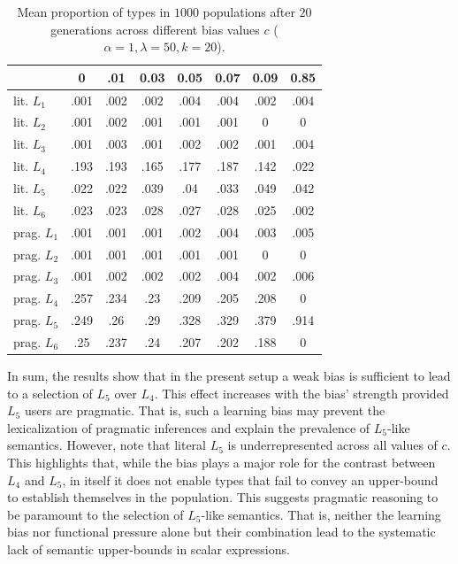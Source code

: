 \documentclass[10pt,a4paper]{article}
\begin{document}
\begin{table}
\centering 
\begin{tabular}{l c c c c c c c}
~ & 0 & .01 & 0.03 & 0.05 & 0.07 & 0.09 & 0.85\\ \hline \hline
lit. $L_1$& .001 & .002 & .002& .004&.004& .002 & .004\\
lit. $L_2$& .001 & .002 & .001& .001&.001&0& 0\\
lit. $L_3$& .001 & .003 & .001& .002&.002& .001& .004\\
lit. $L_4$& .193 & .193 & .165& .177&.187&.142& .022\\
lit. $L_5$& .022 & .022 & .039& .04&.033&.049& .042\\
lit. $L_6$& .023 & .023 & .028& .027&.028&.025& .002\\ \hline
prag. $L_1$ & .001 & .001 &.001& .002&.004&.003& .005 \\
prag. $L_2$ & .001 & .001 &.001& .001&.001&0 & 0 \\
prag. $L_3$ & .001 & .002 &.002& .002&.004&.002& .006 \\ 
prag. $L_4$ & .257 & .234 &.23& .209&.205&.208& 0 \\
prag. $L_5$ & .249 & .26 & .29& .328& .329& .379& .914 \\
prag. $L_6$ & .25 & .237 & .24& .207& .202&.188& 0 


\end{tabular}
\caption{Mean proportion of types in $1000$ populations after $20$ generations across different bias values $c$ ($\alpha = 1, \lambda = 50, k = 20$).}

\label{tab:numeric-results}
\end{table}

In sum, the results show that in the present setup a weak bias is sufficient to lead to a selection of $L_5$ over $L_4$. This effect increases with the bias' strength provided $L_5$ users are pragmatic. That is, such a learning bias may prevent the lexicalization of pragmatic inferences and explain the prevalence of $L_5$-like semantics. However, note that literal $L_5$ is underrepresented across all values of $c$. This highlights that, while the bias plays a major role for the contrast between $L_4$ and $L_5$, in itself it does not enable types that fail to convey an upper-bound to establish themselves in the population. This suggests pragmatic reasoning to be paramount to the selection of $L_5$-like semantics. That is, neither the learning bias nor functional pressure alone but their combination lead to the systematic lack of semantic upper-bounds in scalar expressions.
\end{document}
